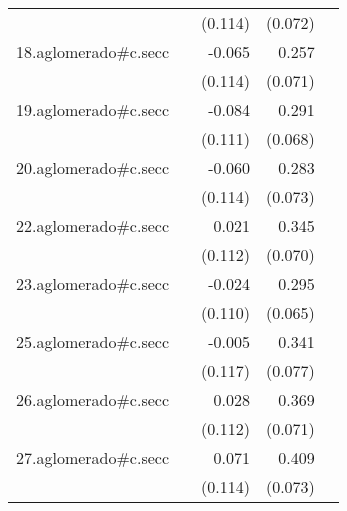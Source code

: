{\begin{longtable}{l*{4}{D{.}{.}{-1}}}
            &                     &     (0.114)         &     (0.072)         &                     \\
\addlinespace
18.aglomerado#c.secc&                     &      -0.065         &       0.257\sym{***}&                     \\
            &                     &     (0.114)         &     (0.071)         &                     \\
\addlinespace
19.aglomerado#c.secc&                     &      -0.084         &       0.291\sym{***}&                     \\
            &                     &     (0.111)         &     (0.068)         &                     \\
\addlinespace
20.aglomerado#c.secc&                     &      -0.060         &       0.283\sym{***}&                     \\
            &                     &     (0.114)         &     (0.073)         &                     \\
\addlinespace
22.aglomerado#c.secc&                     &       0.021         &       0.345\sym{***}&                     \\
            &                     &     (0.112)         &     (0.070)         &                     \\
\addlinespace
23.aglomerado#c.secc&                     &      -0.024         &       0.295\sym{***}&                     \\
            &                     &     (0.110)         &     (0.065)         &                     \\
\addlinespace
25.aglomerado#c.secc&                     &      -0.005         &       0.341\sym{***}&                     \\
            &                     &     (0.117)         &     (0.077)         &                     \\
\addlinespace
26.aglomerado#c.secc&                     &       0.028         &       0.369\sym{***}&                     \\
            &                     &     (0.112)         &     (0.071)         &                     \\
\addlinespace
27.aglomerado#c.secc&                     &       0.071         &       0.409\sym{***}&                     \\
            &                     &     (0.114)         &     (0.073)         &                     \\

\end{longtable}}
